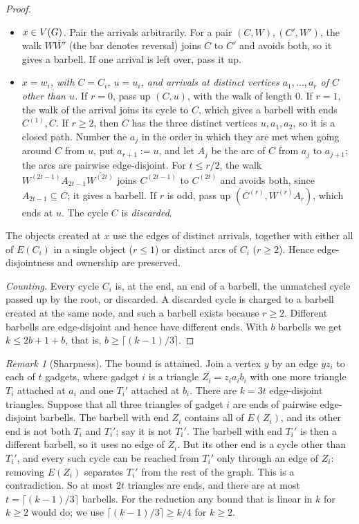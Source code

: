 \documentclass[11pt,a4paper]{article}
\theoremstyle{definition}
\theoremstyle{remark}
\newtheorem{remark}[theorem]{Remark}
\theoremstyle{plain}
\theoremstyle{definition}
\begin{document}
\begin{proof}
\begin{itemize}
\item \emph{\(x\in V(G)\).} Pair the arrivals arbitrarily. For a pair
  \((C,W),(C',W')\), the walk \(W\overline{W'}\) (the bar denotes reversal)
  joins \(C\) to \(C'\) and avoids both, so it gives a barbell. If one
  arrival is left over, pass it up.
\item \emph{\(x=w_i\), with \(C=C_i\), \(u=u_i\), and arrivals at distinct
  vertices \(a_1,\dots,a_r\) of \(C\) other than \(u\).} If \(r=0\), pass up
  \((C,u)\), with the walk of length \(0\). If \(r=1\), the walk of the
  arrival joins its cycle to \(C\), which gives a barbell with ends
  \(C^{(1)},C\). If \(r\ge2\), then \(C\) has the three distinct vertices
  \(u,a_1,a_2\), so it is a closed path. Number the \(a_j\) in the order in
  which they are met when going around \(C\) from \(u\), put \(a_{r+1}:=u\),
  and let \(A_j\) be the arc of \(C\) from \(a_j\) to \(a_{j+1}\); the arcs
  are pairwise edge-disjoint. For \(t\le r/2\), the walk
  \(W^{(2t-1)}A_{2t-1}\overline{W^{(2t)}}\) joins \(C^{(2t-1)}\) to
  \(C^{(2t)}\) and avoids both, since \(A_{2t-1}\subseteq C\); it gives a
  barbell. If \(r\) is odd, pass up \((C^{(r)},W^{(r)}A_r)\), which ends at
  \(u\). The cycle \(C\) is \emph{discarded}.
\end{itemize}
The objects created at \(x\) use the edges of distinct arrivals, together with
either all of \(E(C_i)\) in a single object (\(r\le1\)) or distinct arcs of
\(C_i\) (\(r\ge2\)). Hence edge-disjointness and ownership are preserved.

\emph{Counting.} Every cycle \(C_i\) is, at the end, an end of a barbell, the
unmatched cycle passed up by the root, or discarded. A discarded cycle is
charged to a barbell created at the same node, and such a barbell exists
because \(r\ge2\). Different barbells are edge-disjoint and hence have
different ends. With \(b\) barbells we get \(k\le2b+1+b\), that is,
\(b\ge\lceil(k-1)/3\rceil\).
\end{proof}

\begin{remark}[Sharpness]\label{rem:sharp}
The bound is attained. Join a vertex \(y\) by an edge \(yz_i\) to each of \(t\)
gadgets, where gadget \(i\) is a triangle \(Z_i=z_ia_ib_i\) with one more
triangle \(T_i\) attached at \(a_i\) and one \(T_i'\) attached at \(b_i\).
There are \(k=3t\) edge-disjoint triangles. Suppose that all three triangles of
gadget \(i\) are ends of pairwise edge-disjoint barbells. The barbell with end
\(Z_i\) contains all of \(E(Z_i)\), and its other end is not both \(T_i\) and
\(T_i'\); say it is not \(T_i'\). The barbell with end \(T_i'\) is then a
different barbell, so it uses no edge of \(Z_i\). But its other end is a
cycle other than \(T_i'\), and every such cycle can be reached from \(T_i'\) only
through an edge of \(Z_i\): removing \(E(Z_i)\) separates \(T_i'\) from the
rest of the graph. This is a contradiction. So at most \(2t\) triangles are
ends, and there are at most \(t=\lceil(k-1)/3\rceil\) barbells. For the reduction any
bound that is linear in \(k\) for \(k\ge2\) would do; we use
\(\lceil(k-1)/3\rceil\ge k/4\) for \(k\ge2\).
\end{remark}
\end{document}
